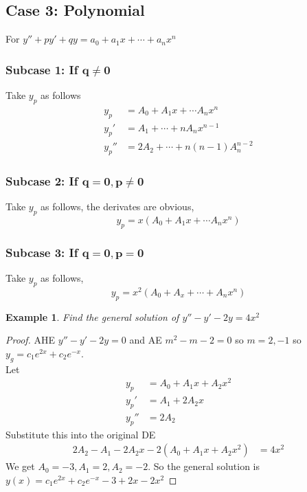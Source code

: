 \documentclass[oneside,11pt,pdftex,final]{book}%
\numberwithin{equation}{section}
\newtheorem{example}[theorem]{Example}
\numberwithin{section}{chapter}
\numberwithin{equation}{chapter}
\begin{document}
\subsection{Case 3: Polynomial}
For $ y''+py'+qy=a_0+a_1x+\cdots+a_nx^n $
\subsubsection{Subcase 1: If $ \mathbf{q\neq0} $}
Take $ y_p $ as follows
\begin{align*}
	y_p&=A_0+A_1x+\cdots A_nx^n\\
	y_p'&=A_1+\cdots+n A_nx^{n-1}\\
	y_p''&=2A_2+\cdots+n(n-1)A_n^{n-2}
\end{align*}
\subsubsection{Subcase 2: If $ \mathbf{q=0, p \neq 0} $}
Take $ y_p $ as follows, the derivates are obvious,
$$y_p=x(A_0+A_1x+\cdots A_nx^n) $$
\subsubsection{Subcase 3: If $ \mathbf{q=0,p=0} $}
Take $ y_p $ as follows,
$$ y_p=x^2(A_0+A_x+\cdots + A_n x^n) $$


\begin{example}
	Find the general solution of $ y''-y'-2y=4x^2 $
\end{example}
\begin{proof}
	AHE $ y''-y'-2y=0 $ and AE $ m^2-m-2=0 $ so $ m=2,-1 $ so $ y_g=c_1e^{2x}+c_2e^{-x} $.\\
	Let 
	\begin{align*}
		y_p&=A_0+A_1x+A_2x^2 \\
		y_p'&=A_1+2A_2x\\
		y_p''&=2A_2
	\end{align*}
Substitute this into the original DE
\begin{align*}
	2A_2-A_1-2A_2x-2(A_0+A_1x+A_2x^2)&=4x^2
\end{align*}
We get $ A_0=-3,A_1=2,A_2=-2 $.
So the general solution is $ y(x)=c_1e^{2x}+c_2e^{-x}-3+2x-2x^2 $
\end{proof}
\end{document}
